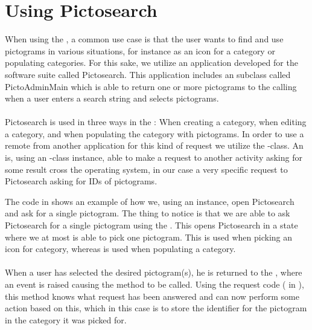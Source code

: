 
\section{Using Pictosearch}
\label{sec:using_pictosearch}

When using the \ct, a common use case is that the user wants to find and use pictograms in various situations, for instance as an icon for a category or populating categories. For this sake, we utilize an application developed for the \giraf software suite called Pictosearch. This application includes an  subclass called PictoAdminMain  which is able to return one or more pictograms to the calling  when a user enters a search string and selects pictograms. 
\\\\
Pictosearch is used in three ways in the \ct: When creating a category, when editing a category, and when populating the category with pictograms. In order to use a remote  from another application for this kind of request we utilize the -class. An  is, using an -class instance, able to make a request to another activity asking for some result cross the operating system, in our case a very specific request to Pictosearch asking for IDs of pictograms. 



The code in  shows an example of how we, using an  instance, open Pictosearch and ask for a single pictogram. The thing to notice is that we are able to ask Pictosearch for a single pictogram using the . This opens Pictosearch in a state where we at most is able to pick one pictogram. This is used when picking an icon for category, whereas  is used when populating a category. 
\\\\
When a user has selected the desired pictogram(s), he is returned to the \ct, where an event is raised causing the method  to be called. Using the request code ( in ), this method knows what request has been answered and can now perform some action based on this, which in this case is to store the identifier for the pictogram in the category it was picked for.

